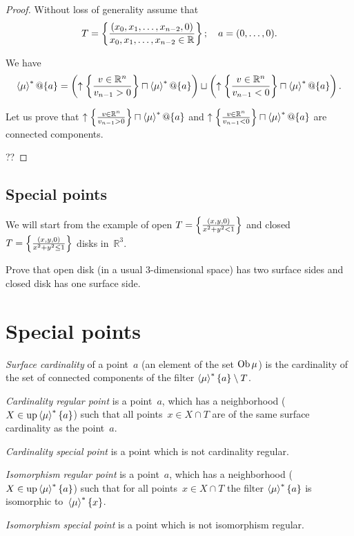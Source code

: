 \begin{proof}
Without loss of generality assume that
\[ T=\left\{ \frac{(x_0,x_1,\dots,x_{n-2},0)}{
x_0,x_1,\dots,x_{n-2}\in\mathbb{R}}\right\};
\quad
a = (0,\dots,0). \]

We have
\[ \left\langle \mu\right\rangle ^{\ast}@\{a\} =
\left(\uparrow\left\{ \frac{v\in\mathbb{R}^n}{v_{n-1}>0}\right\}\sqcap\left\langle \mu\right\rangle ^{\ast}@\{a\}\right)
\sqcup
\left(\uparrow\left\{ \frac{v\in\mathbb{R}^n}{v_{n-1}<0}\right\}\sqcap\left\langle \mu\right\rangle ^{\ast}@\{a\}\right). \]

Let us prove that
$\uparrow\left\{ \frac{v\in\mathbb{R}^n}{v_{n-1}>0}\right\}\sqcap\left\langle \mu\right\rangle ^{\ast}@\{a\}$ and
$\uparrow\left\{ \frac{v\in\mathbb{R}^n}{v_{n-1}<0}\right\}\sqcap\left\langle \mu\right\rangle ^{\ast}@\{a\}$ are
connected components.

??
\end{proof}

\subsection{Special points}

We will start from the example of open $T=\left\{ \frac{(x,y,0)}{x^2+y^2<1}\right\}$
and closed $T=\left\{ \frac{(x,y,0)}{x^2+y^2\leq 1}\right\}$ disks in~$\mathbb{R}^3$.

\begin{xca}
Prove that open disk (in a usual 3-dimensional space) has two surface sides
and closed disk has one surface side.
\end{xca}

\section{Special points}

\begin{defn}
\emph{Surface cardinality} of a point~$a$ (an element of the set $\operatorname{Ob}\mu$) is
the cardinality of the set of connected components of the filter
$\left\langle \mu\right\rangle ^{\ast}\{a\}\setminus T$.
\end{defn}

\begin{defn}
\emph{Cardinality regular point} is a point~$a$, which has a neighborhood
($X\in\operatorname{up}\left\langle \mu\right\rangle ^{\ast}\{a\}$) such that all points~$x\in X\cap T$
are of the same surface cardinality as the point~$a$.

\emph{Cardinality special point} is a point which is not cardinality regular.
\end{defn}

\begin{defn}
\emph{Isomorphism regular point} is a point~$a$, which has a neighborhood
($X\in\operatorname{up}\left\langle \mu\right\rangle ^{\ast}\{a\}$) such that for all points~$x\in X\cap T$
the filter $\left\langle \mu\right\rangle ^{\ast}\{a\}$ is isomorphic
to~$\left\langle \mu\right\rangle ^{\ast}\{x\}$.

\emph{Isomorphism special point} is a point which is not isomorphism regular.
\end{defn}

